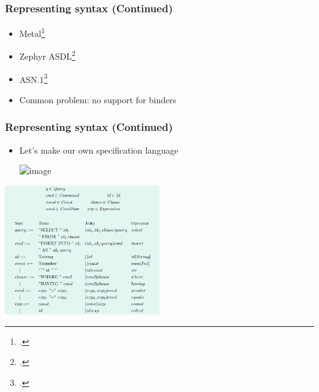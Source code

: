 \documentclass[t,24pt,aspectratio=169]{beamer}
\begin{document}
\begin{frame}
    \frametitle{Representing syntax (Continued)}
    \begin{itemize}
        \item Metal\footcite{metal}
              \pause
        \item Zephyr ASDL\footcite{zephyr}
              \pause
        \item ASN.1\footcite{asn1}
              \pause
        \item Common problem: no support for binders
    \end{itemize}
\end{frame}

\begin{frame}
    \frametitle{Representing syntax (Continued)}
    \begin{multicols}{2}
        \begin{itemize}
            \item Let's make our own specification language
                  \vspace{1cm}

                  \includegraphics<2->[width=0.45\textwidth]{img/spec-lang-parseable-ex.png}
        \end{itemize}

        \columnbreak
        \includegraphics[width=0.5\textwidth]{img/spec-lang-ex.png}
    \end{multicols}

\end{frame}
\end{document}
